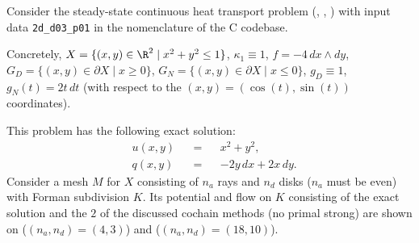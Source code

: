 \begin{example}
  Consider the steady-state continuous heat transport problem
  (,
   ,
   )
  with input data \verb|2d_d03_p01| in the nomenclature of the C codebase.

  Concretely,
    $X = \{(x, y) \in \R^2 \mid x^2 + y^2 \leq 1\}$,
    $\kappa_1 \equiv 1$,
    $f = - 4 \, d x \wedge d y$,
    $G_D = \{(x, y) \in \partial X \mid x \geq 0\}$,
    $G_N = \{(x, y) \in \partial X \mid x \leq 0\}$,
    $g_D \equiv 1$,
    $g_N(t) = 2 t \, d t$
    (with respect to the $(x, y) = (\cos(t), \sin(t))$ coordinates).

  This problem has the following exact solution:
  \begin{subequations}
    \begin{alignat}{3}
      & u(x, y) && = && x^2 + y^2, \\
      & q(x, y) && = && -2 y \, d x + 2 x \, d y.
    \end{alignat}
  \end{subequations}
  Consider a mesh $M$ for $X$ consisting of $n_a$ rays and $n_d$ disks
  ($n_a$ must be even) with Forman subdivision $K$.
  Its potential and flow on $K$ consisting of the exact solution and the $2$
  of the discussed cochain methods (no primal strong) are shown on
  ($(n_a, n_d) = (4, 3)$)
  and
  ($(n_a, n_d) = (18, 10)$).
\end{example}
